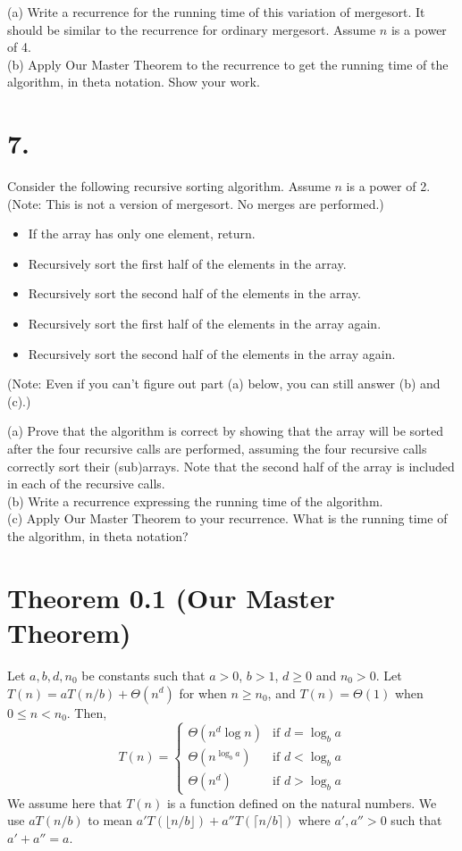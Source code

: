 \documentclass{article}
\begin{document}
(a) Write a recurrence for the running time of this variation of mergesort. It should be similar to the recurrence for ordinary mergesort. Assume $n$ is a power of 4. \\
(b) Apply Our Master Theorem to the recurrence to get the running time of the algorithm, in theta notation. Show your work.

\section*{7.}
Consider the following recursive sorting algorithm. Assume $n$ is a power of 2. (Note: This is not a version of mergesort. No merges are performed.)
\begin{itemize}
    \item If the array has only one element, return.
    \item Recursively sort the first half of the elements in the array.
    \item Recursively sort the second half of the elements in the array.
    \item Recursively sort the first half of the elements in the array again.
    \item Recursively sort the second half of the elements in the array again.
\end{itemize}
(Note: Even if you can’t figure out part (a) below, you can still answer (b) and (c).)

(a) Prove that the algorithm is correct by showing that the array will be sorted after the four recursive calls are performed, assuming the four recursive calls correctly sort their (sub)arrays. Note that the second half of the array is included in each of the recursive calls. \\
(b) Write a recurrence expressing the running time of the algorithm. \\
(c) Apply Our Master Theorem to your recurrence. What is the running time of the algorithm, in theta notation?

\section*{Theorem 0.1 (Our Master Theorem)}
Let $a, b, d, n_0$ be constants such that $a > 0$, $b > 1$, $d \geq 0$ and $n_0 > 0$.
Let $T(n) = aT(n/b) + \Theta(n^d)$ for when $n \geq n_0$, and $T(n) = \Theta(1)$ when $0 \leq n < n_0$. Then,
\[
T(n) = \begin{cases}
\Theta(n^d \log n) & \text{if } d = \log_b a \\
\Theta(n^{\log_b a}) & \text{if } d < \log_b a \\
\Theta(n^d) & \text{if } d > \log_b a
\end{cases}
\]
We assume here that $T(n)$ is a function defined on the natural numbers. We use $aT(n/b)$ to mean $a'T(\lfloor n/b \rfloor) + a''T(\lceil n/b \rceil)$ where $a', a'' > 0$ such that $a' + a'' = a$.
\end{document}
